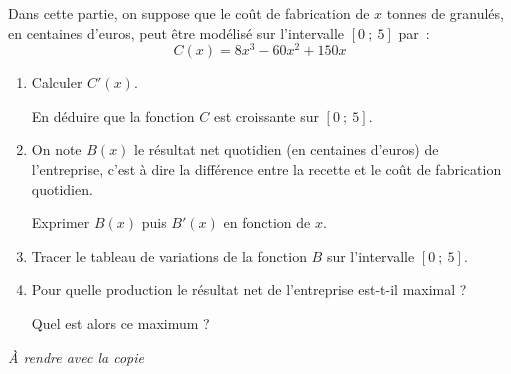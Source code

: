 %
\par
Dans cette partie, on suppose que le coût de fabrication de $x$ tonnes de granulés, en centaines d'euros, peut être modélisé sur l'intervalle $[0~;~5]$ par~:
\[ C(x)=8x^3-60x^2+150x \]
\begin{enumerate}
     \item Calculer $C'(x)$.
     \par
     En déduire que la fonction $C$ est croissante sur $[0~;~5]$.
     \par
     \medskip
     \par
     \item On note $B(x)$ le résultat net quotidien (en centaines d'euros) de l'entreprise, c'est à dire la différence entre la recette et le coût de fabrication quotidien.
     \par
     Exprimer $B(x)$ puis $B'(x)$ en fonction de $x$.
     \par
     \medskip
     \par
     \item Tracer le tableau de variations de la fonction $B$ sur l'intervalle $[0~;~5]$.
     \par
     \medskip
     \par
     \item Pour quelle production le résultat net de l'entreprise est-t-il maximal ?
     \par
     Quel est alors ce maximum ?
     \par
     \medskip
     \par
\end{enumerate}
%
%
%
%
%
\medskip
%
\begin{center}
     \emph{\`A rendre avec la copie}
\end{center}
%
\bigskip
%
